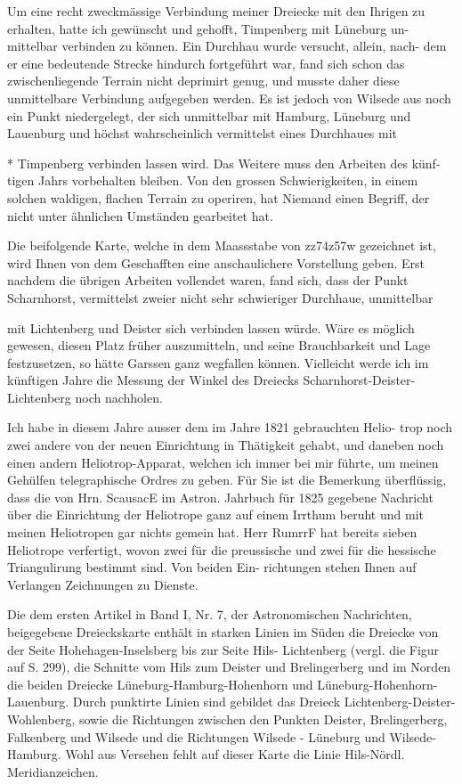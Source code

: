 \documentclass[12pt,a4paper]{article}
\theoremstyle{plain}
\theoremstyle{definition}
\theoremstyle{remark}
\begin{document}
\noindent
Um eine recht zweckmässige Verbindung meiner Dreiecke mit den Ihrigen
zu erhalten, hatte ich gewünscht und gehofft, Timpenberg mit Lüneburg un-
mittelbar verbinden zu können. Ein Durchhau wurde versucht, allein, nach-
dem er eine bedeutende Strecke hindurch fortgeführt war, fand sich schon
das zwischenliegende Terrain nicht deprimirt genug, und musste daher diese
unmittelbare Verbindung aufgegeben werden. Es ist jedoch von Wilsede aus
noch ein Punkt niedergelegt, der sich unmittelbar mit Hamburg, Lüneburg
und Lauenburg und höchst wahrscheinlich vermittelst eines Durchhaues mit

\noindent
* Timpenberg verbinden lassen wird. Das Weitere muss den Arbeiten des künf-
tigen Jahrs vorbehalten bleiben. Von den grossen Schwierigkeiten, in einem
solchen waldigen, flachen Terrain zu operiren, hat Niemand einen Begriff,
der nicht unter ähnlichen Umständen gearbeitet hat.

\noindent
Die beifolgende Karte, welche in dem Maassstabe von zz74z57w gezeichnet
ist, wird Ihnen von dem Geschafften eine anschaulichere Vorstellung geben.
Erst nachdem die übrigen Arbeiten vollendet waren, fand sich, dass der Punkt
Scharnhorst, vermittelst zweier nicht sehr schwieriger Durchhaue, unmittelbar

\noindent

\noindent
mit Lichtenberg und Deister sich verbinden lassen würde. Wäre es möglich
gewesen, diesen Platz früher auszumitteln, und seine Brauchbarkeit und Lage
festzusetzen, so hätte Garssen ganz wegfallen können. Vielleicht werde ich
im künftigen Jahre die Messung der Winkel des Dreiecks Scharnhorst-Deister-
Lichtenberg noch nachholen.

\noindent
Ich habe in diesem Jahre ausser dem im Jahre 1821 gebrauchten Helio-
trop noch zwei andere von der neuen Einrichtung in Thätigkeit gehabt, und
daneben noch einen andern Heliotrop-Apparat, welchen ich immer bei mir
führte, um meinen Gehülfen telegraphische Ordres zu geben. Für Sie ist die
Bemerkung überflüssig, dass die von Hrn. ScausacE im Astron. Jahrbuch für
1825 gegebene Nachricht über die Einrichtung der Heliotrope ganz auf einem
Irrthum beruht und mit meinen Heliotropen gar nichts gemein hat. Herr
RumrrF hat bereits sieben Heliotrope verfertigt, wovon zwei für die preussische
und zwei für die hessische Triangulirung bestimmt sind. Von beiden Ein-
richtungen stehen Ihnen auf Verlangen Zeichnungen zu Dienste.

\noindent

\noindent
Die dem ersten Artikel in Band I, Nr. 7, der Astronomischen Nachrichten, beigegebene Dreieckskarte
enthält in starken Linien im Süden die Dreiecke von der Seite Hohehagen-Inselsberg bis zur Seite Hils-
Lichtenberg (vergl. die Figur auf S. 299), die Schnitte vom Hils zum Deister und Brelingerberg und im
Norden die beiden Dreiecke Lüneburg-Hamburg-Hohenhorn und Lüneburg-Hohenhorn-Lauenburg. Durch
punktirte Linien sind gebildet das Dreieck Lichtenberg-Deister-Wohlenberg, sowie die Richtungen zwischen
den Punkten Deister, Brelingerberg, Falkenberg und Wilsede und die Richtungen Wilsede - Lüneburg und
Wilsede-Hamburg. Wohl aus Versehen fehlt auf dieser Karte die Linie Hils-Nördl. Meridianzeichen.
\end{document}
